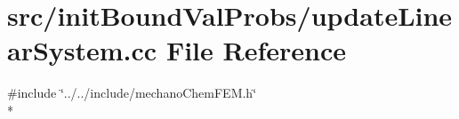 \section{src/init\-Bound\-Val\-Probs/update\-Linear\-System.cc File Reference}
\label{update_linear_system_8cc}
{\ttfamily \#include \char`\"{}../../include/mechano\-Chem\-F\-E\-M.\-h\char`\"{}}\\*
